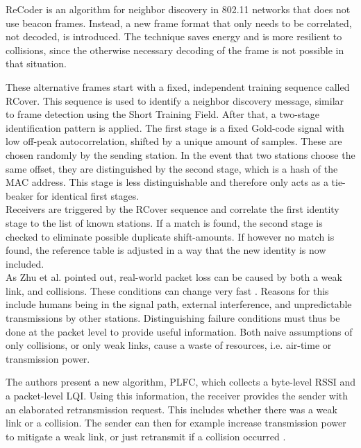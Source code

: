 ReCoder \cite{meng2015} is an algorithm for neighbor discovery in 802.11 networks that does not use beacon frames. Instead, a new frame format that only needs to be correlated, not decoded, is introduced. The technique saves energy and is more resilient to collisions, since the otherwise necessary decoding of the frame is not possible in that situation.

These alternative frames start with a fixed, independent training sequence called RCover. This sequence is used to identify a neighbor discovery message, similar to frame detection using the Short Training Field. After that, a two-stage identification pattern is applied. The first stage is a fixed Gold-code signal with low off-peak autocorrelation, shifted by a unique amount of samples. These are chosen randomly by the sending station. In the event that two stations choose the same offset, they are distinguished by the second stage, which is a hash of the \gls{MAC} address. This stage is less distinguishable and therefore only acts as a tie-beaker for identical first stages.\\

Receivers are triggered by the RCover sequence and correlate the first identity stage to the list of known stations. If a match is found, the second stage is checked to eliminate possible duplicate shift-amounts. If however no match is found, the reference table is adjusted in a way that the new identity is now included.\\

As Zhu et al. pointed out, real-world packet loss can be caused by both a weak link, and collisions. These conditions can change very fast \cite{zhu2015}. Reasons for this include humans being in the signal path, external interference, and unpredictable transmissions by other stations. Distinguishing failure conditions must thus be done at the packet level to provide useful information. Both naive assumptions of only collisions, or only weak links, cause a waste of resources, i.e. air-time or transmission power.

The authors present a new algorithm, \gls{PLFC}, which collects a byte-level \gls{RSSI} and a packet-level \gls{LQI}. Using this information, the receiver provides the sender with an elaborated retransmission request. This includes whether there was a weak link or a collision. The sender can then for example increase transmission power to mitigate a weak link, or just retransmit if a collision occurred \cite{zhu2015}.\\

